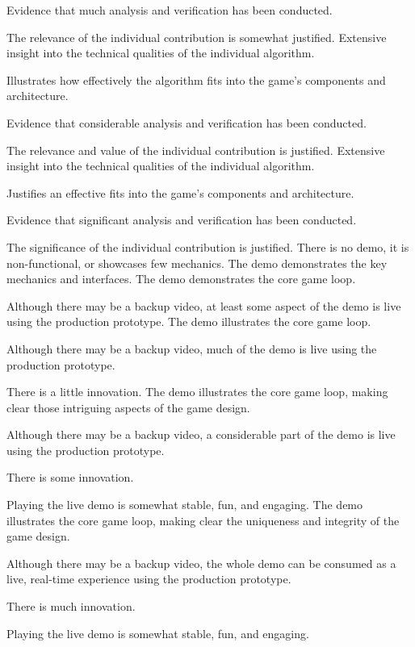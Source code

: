 \documentclass{../../fal_assignment}
\begin{document}
\begin{markingrubric}
            \par Evidence that much analysis and verification has been conducted.
            \par The relevance of the individual contribution is somewhat justified.
        \grade Extensive insight into the technical qualities of the individual algorithm.
            \par Illustrates how effectively the algorithm fits into the game's components and architecture.
            \par Evidence that considerable analysis and verification has been conducted.
            \par The relevance and value of the individual contribution is justified.
        \grade Extensive insight into the technical qualities of the individual algorithm.
            \par Justifies an effective fits into the game's components and architecture.
            \par Evidence that significant analysis and verification has been conducted.
            \par The significance of the individual contribution is justified.
%
        \grade\fail There is no demo, it is non-functional, or showcases few mechanics.
        \grade The demo demonstrates the key mechanics and interfaces.
        \grade The demo demonstrates the core game loop.
            \par Although there may be a backup video, at least some aspect of the demo is live using the production prototype.
        \grade The demo illustrates the core game loop.
            \par Although there may be a backup video, much of the demo is live using the production prototype.
            \par There is a little innovation.
        \grade The demo illustrates the core game loop, making clear those intriguing aspects of the game design.
            \par Although there may be a backup video, a considerable part of the demo is live using the production prototype.
            \par There is some innovation.
            \par Playing the live demo is somewhat stable, fun, and engaging.
        \grade The demo illustrates the core game loop, making clear the uniqueness and integrity of the game design.
            \par Although there may be a backup video, the whole demo can be consumed as a live, real-time experience using the production prototype.
            \par There is much innovation.
            \par Playing the live demo is somewhat stable, fun, and engaging.	
\end{markingrubric}
\end{document}
